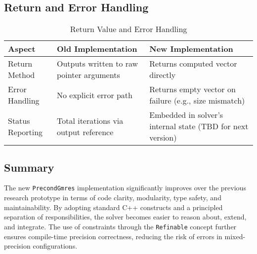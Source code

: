 \documentclass[12pt, titlepage]{article}
\begin{document}
\subsection*{Return and Error Handling}

\begin{table}[H]
  \centering
  \begin{tabularx}{\linewidth}{%
    >{\raggedright\arraybackslash}l
    >{\raggedright\arraybackslash}X
    >{\raggedright\arraybackslash}X
    }
    \toprule
    \textbf{Aspect}        & \textbf{Old Implementation}                    & \textbf{New Implementation}                                      \\
    \midrule
    Return Method    & Outputs written to raw pointer arguments & Returns computed vector directly                           \\
    Error Handling   & No explicit error path                   & Returns empty vector on failure (e.g., size mismatch)      \\
    Status Reporting & Total iterations via output reference    & Embedded in solver’s internal state (TBD for next version) \\
    \bottomrule
  \end{tabularx}
  \caption{Return Value and Error Handling}
\end{table}

\subsection*{Summary}

The new \texttt{PrecondGmres} implementation significantly improves over the previous
research prototype in terms of code clarity, modularity, type safety, and
maintainability. By adopting standard C++ constructs and a principled separation
of responsibilities, the solver becomes easier to reason about, extend, and
integrate. The use of constraints through the \texttt{Refinable} concept further
ensures compile-time precision correctness, reducing the risk of errors in
mixed-precision configurations.
\end{document}
